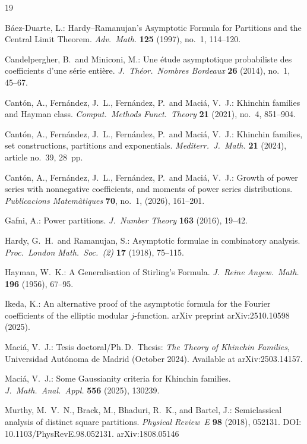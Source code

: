 \documentclass[12pt]{amsart}
\theoremstyle{definition}
\begin{document}
\begin{thebibliography}{19}

B\'aez-Duarte, L.:
Hardy--Ramanujan's Asymptotic Formula for Partitions and the Central Limit Theorem.
\textit{Adv.\ Math.} \textbf{125} (1997), no.~1, 114--120.

Candelpergher, B.\ and Miniconi, M.:
Une \'etude asymptotique probabiliste des coefficients d'une s\'erie enti\`ere.
\textit{J.\ Th\'eor.\ Nombres Bordeaux} \textbf{26} (2014), no.~1, 45--67.

Cant\'on, A., Fern\'andez, J.~L., Fern\'andez, P.\ and Maci\'a, V.~J.:
Khinchin families and Hayman class.
\textit{Comput.\ Methods Funct.\ Theory} \textbf{21} (2021), no.~4, 851--904.

Cant\'on, A., Fern\'andez, J.~L., Fern\'andez, P.\ and Maci\'a, V.~J.:
Khinchin families, set constructions, partitions and exponentials.
\textit{Mediterr.\ J.\ Math.} \textbf{21} (2024), article no.~39, 28~pp.

Cant\'on, A., Fern\'andez, J.~L., Fern\'andez, P.\ and Maci\'a, V.~J.:
Growth of power series with nonnegative coefficients, and moments of power series distributions.
\textit{Publicacions Matem\`atiques} \textbf{70}, no.~1, (2026), 161--201.

Gafni, A.:
Power partitions.
\textit{J.\ Number Theory} \textbf{163} (2016), 19--42.

Hardy, G.~H.\ and Ramanujan, S.:
Asymptotic formulae in combinatory analysis.
\textit{Proc.\ London Math.\ Soc.\ (2)} \textbf{17} (1918), 75--115.

Hayman, W.~K.:
A Generalisation of Stirling's Formula.
\textit{J.\ Reine Angew.\ Math.} \textbf{196} (1956), 67--95.

Ikeda, K.:
An alternative proof of the asymptotic formula for the Fourier coefficients of the elliptic modular $j$-function.
arXiv preprint arXiv:2510.10598 (2025).

Maci\'a, V.~J.:
Tesis doctoral/Ph.\,D.\ Thesis: \textit{The Theory of Khinchin Families},
Universidad Aut\'onoma de Madrid (October 2024).
Available at arXiv:2503.14157.

Maci\'a, V.~J.:
Some Gaussianity criteria for Khinchin families.
\textit{J.\ Math.\ Anal.\ Appl.} \textbf{556} (2025), 130239.

Murthy, M.~V.~N., Brack, M., Bhaduri, R.~K., and Bartel, J.:
Semiclassical analysis of distinct square partitions.
\textit{Physical Review~E} \textbf{98} (2018), 052131.
DOI: 10.1103/PhysRevE.98.052131.
arXiv:1808.05146


\end{thebibliography}
\end{document}
